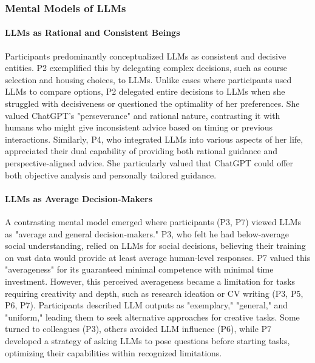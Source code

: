 \subsubsection{Mental Models of LLMs}
\paragraph{LLMs as Rational and Consistent Beings}
Participants predominantly conceptualized LLMs as consistent and decisive entities. P2 exemplified this by delegating complex decisions, such as course selection and housing choices, to LLMs. Unlike cases where participants used LLMs to compare options, P2 delegated entire decisions to LLMs when she struggled with decisiveness or questioned the optimality of her preferences. She valued ChatGPT's "perseverance" and rational nature, contrasting it with humans who might give inconsistent advice based on timing or previous interactions. Similarly, P4, who integrated LLMs into various aspects of her life, appreciated their dual capability of providing both rational guidance and perspective-aligned advice. She particularly valued that ChatGPT could offer both objective analysis and personally tailored guidance.

\paragraph{LLMs as Average Decision-Makers}
A contrasting mental model emerged where participants (P3, P7) viewed LLMs as "average and general decision-makers." P3, who felt he had below-average social understanding, relied on LLMs for social decisions, believing their training on vast data would provide at least average human-level responses. P7 valued this "averageness" for its guaranteed minimal competence with minimal time investment. However, this perceived averageness became a limitation for tasks requiring creativity and depth, such as research ideation or CV writing (P3, P5, P6, P7). Participants described LLM outputs as "exemplary," "general," and "uniform," leading them to seek alternative approaches for creative tasks. Some turned to colleagues (P3), others avoided LLM influence (P6), while P7 developed a strategy of asking LLMs to pose questions before starting tasks, optimizing their capabilities within recognized limitations.

